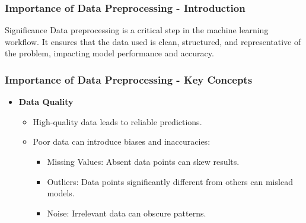 \documentclass[aspectratio=169]{beamer}
\begin{document}
\begin{frame}[fragile]
    \frametitle{Importance of Data Preprocessing - Introduction}
    \begin{block}{Significance}
        Data preprocessing is a critical step in the machine learning workflow. 
        It ensures that the data used is clean, structured, and representative of the problem, impacting model performance and accuracy.
    \end{block}
\end{frame}

\begin{frame}[fragile]
    \frametitle{Importance of Data Preprocessing - Key Concepts}
    \begin{itemize}
        \item \textbf{Data Quality}
            \begin{itemize}
                \item High-quality data leads to reliable predictions.
                \item Poor data can introduce biases and inaccuracies:
                    \begin{itemize}
                        \item Missing Values: Absent data points can skew results.
                        \item Outliers: Data points significantly different from others can mislead models.
                        \item Noise: Irrelevant data can obscure patterns.
                    \end{itemize}
            \end{itemize}


\end{itemize}
\end{frame}
\end{document}

